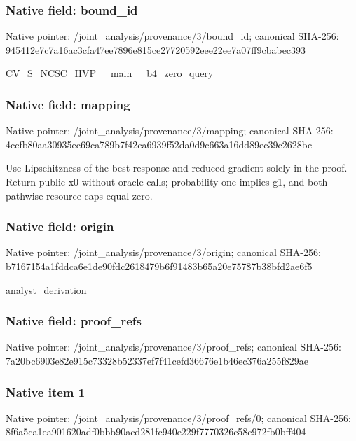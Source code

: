\documentclass[10pt,a4paper]{article}
\begin{document}
\subsubsection{Native field: bound\_\allowbreak{}id}
Native pointer: /joint\_\allowbreak{}analysis/provenance/3/bound\_\allowbreak{}id; canonical SHA-256: 945412e7c7a16ac3cfa47ee7896e815ce27720592eee22ee7a07ff9cbabec393

\begingroup\raggedright\sloppy CV\_\allowbreak{}S\_\allowbreak{}NCSC\_\allowbreak{}HVP\_\allowbreak{}\_\allowbreak{}main\_\allowbreak{}\_\allowbreak{}b4\_\allowbreak{}zero\_\allowbreak{}query\par\endgroup

\subsubsection{Native field: mapping}
Native pointer: /joint\_\allowbreak{}analysis/provenance/3/mapping; canonical SHA-256: 4ccfb80aa30935ec69ca789b7f42ca6939f52da0d9c663a16dd89ec39c2628bc

\begingroup\raggedright\sloppy Use Lipschitzness of the best response and reduced gradient solely in the proof. Return public x0 without oracle calls;\allowbreak{} probability one implies g1,\allowbreak{} and both pathwise resource caps equal zero.\par\endgroup

\subsubsection{Native field: origin}
Native pointer: /joint\_\allowbreak{}analysis/provenance/3/origin; canonical SHA-256: b7167154a1fddca6e1de90fdc2618479b6f91483b65a20e75787b38bfd2ae6f5

\begingroup\raggedright\sloppy analyst\_\allowbreak{}derivation\par\endgroup

\subsubsection{Native field: proof\_\allowbreak{}refs}
Native pointer: /joint\_\allowbreak{}analysis/provenance/3/proof\_\allowbreak{}refs; canonical SHA-256: 7a20bc6903e82e915c73328b52337ef7f41cefd36676e1b46ec376a255f829ae

\subsubsection{Native item 1}
Native pointer: /joint\_\allowbreak{}analysis/provenance/3/proof\_\allowbreak{}refs/0; canonical SHA-256: 8f6a5ca1ea901620adf0bbb90acd281fc940e229f7770326c58c972fb0bff404
\end{document}
